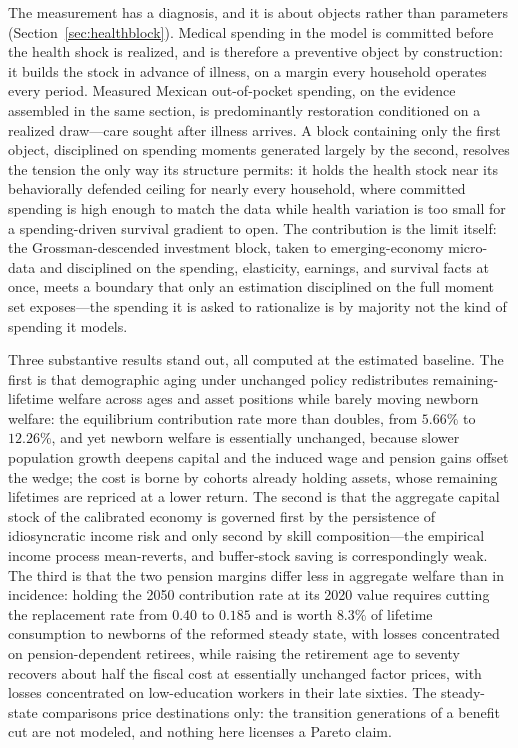 \documentclass[12pt,a4paper]{article}
\begin{document}
The measurement has a diagnosis, and it is about objects rather than parameters (Section~\ref{sec:healthblock}). Medical spending in the model is committed before the health shock is realized, and is therefore a preventive object by construction: it builds the stock in advance of illness, on a margin every household operates every period. Measured Mexican out-of-pocket spending, on the evidence assembled in the same section, is predominantly restoration conditioned on a realized draw---care sought after illness arrives. A block containing only the first object, disciplined on spending moments generated largely by the second, resolves the tension the only way its structure permits: it holds the health stock near its behaviorally defended ceiling for nearly every household, where committed spending is high enough to match the data while health variation is too small for a spending-driven survival gradient to open. The contribution is the limit itself: the Grossman-descended investment block, taken to emerging-economy micro-data and disciplined on the spending, elasticity, earnings, and survival facts at once, meets a boundary that only an estimation disciplined on the full moment set exposes---the spending it is asked to rationalize is by majority not the kind of spending it models.

Three substantive results stand out, all computed at the estimated baseline. The first is that demographic aging under unchanged policy redistributes remaining-lifetime welfare across ages and asset positions while barely moving newborn welfare: the equilibrium contribution rate more than doubles, from $5.66\%$ to $12.26\%$, and yet newborn welfare is essentially unchanged, because slower population growth deepens capital and the induced wage and pension gains offset the wedge; the cost is borne by cohorts already holding assets, whose remaining lifetimes are repriced at a lower return. The second is that the aggregate capital stock of the calibrated economy is governed first by the persistence of idiosyncratic income risk and only second by skill composition---the empirical income process mean-reverts, and buffer-stock saving is correspondingly weak. The third is that the two pension margins differ less in aggregate welfare than in incidence: holding the 2050 contribution rate at its 2020 value requires cutting the replacement rate from $0.40$ to $0.185$ and is worth $8.3\%$ of lifetime consumption to newborns of the reformed steady state, with losses concentrated on pension-dependent retirees, while raising the retirement age to seventy recovers about half the fiscal cost at essentially unchanged factor prices, with losses concentrated on low-education workers in their late sixties. The steady-state comparisons price destinations only: the transition generations of a benefit cut are not modeled, and nothing here licenses a Pareto claim.
\end{document}
